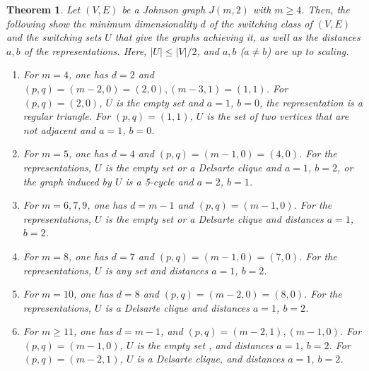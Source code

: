 \documentclass[a4paper, 11pt]{article}
\newtheorem{theorem}{Theorem}[section]
\theoremstyle{definition}
\begin{document}
\begin{theorem} \label{thm:Johnson}
Let $(V,E)$ be a Johnson graph $J(m,2)$ with $m\geq 4$.  
Then, the following show the minimum dimensionality $d$ of the switching class of $(V,E)$ and the switching sets $U$ that give the graphs achieving it, as well as the distances $a,b$ of the representations. 
Here, $|U| \leq |V|/2$, and $a,b$ ($a\ne b$) are up to scaling. 
\begin{enumerate}
\item For $m=4$, one has $d=2$ and $(p,q)=(m-2,0)=(2,0), (m-3,1)=(1,1)$. 
For $(p,q)=(2,0)$,  $U$ is the empty set and $a=1$, $b=0$, the representation is a regular triangle.
For $(p,q)=(1,1)$,  $U$ is the set of two vertices that are not adjacent and $a=1$, $b=0$. 
\item For $m=5$, one has $d=4$ and $(p,q)=(m-1,0)=(4,0)$. 
For the representations, $U$ is the empty set or a Delsarte clique and $a=1$, $b=2$, or
the graph induced by $U$ is a 5-cycle and $a=2$, $b=1$. 
\item For $m=6,7,9$, one has $d=m-1$ and $(p,q)=(m-1,0)$. 
For the representations, $U$ is the empty set or a Delsarte clique and distances $a=1$, $b=2$. 
\item For $m= 8$, one has $d=7$ and $(p,q)=(m-1,0)=(7,0)$. 
For the representations, $U$ is any set and distances $a=1$, $b=2$. 
\item For $m=10$, one has $d=8$ and $(p,q)=(m-2,0)=(8,0)$.   For the representations, $U$ is a Delsarte clique and distances $a=1$, $b=2$. 
\item For $m\geq 11$, one has $d=m-1$, and $(p,q)=(m-2,1),(m-1,0)$. 
For $(p,q)=(m-1,0)$, $U$ is the empty set , and distances $a=1$, $b=2$. 
For $(p,q)=(m-2,1)$, $U$ is a Delsarte clique, and  distances $a=1$, $b=2$.
\end{enumerate} 
\end{theorem}
\end{document}
